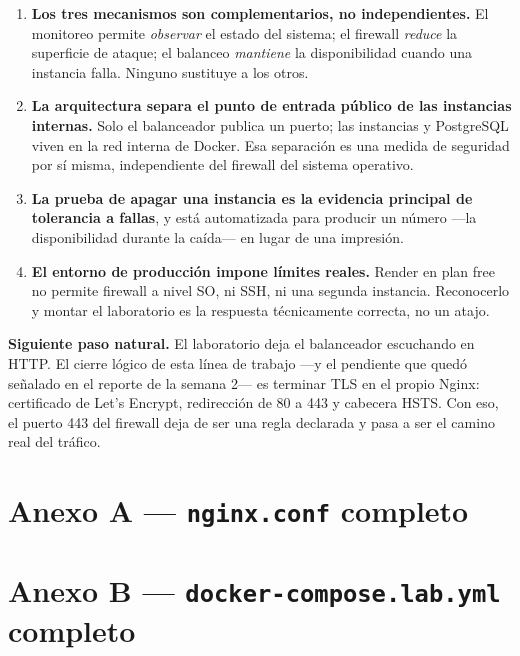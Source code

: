 \documentclass[11pt,letterpaper]{article}
\begin{document}
\begin{enumerate}[leftmargin=1.4em,itemsep=4pt]
  \item \textbf{Los tres mecanismos son complementarios, no independientes.} El
        monitoreo permite \emph{observar} el estado del sistema; el firewall
        \emph{reduce} la superficie de ataque; el balanceo \emph{mantiene} la
        disponibilidad cuando una instancia falla. Ninguno sustituye a los otros.
  \item \textbf{La arquitectura separa el punto de entrada público de las
        instancias internas.} Solo el balanceador publica un puerto; las
        instancias y PostgreSQL viven en la red interna de Docker. Esa
        separación es una medida de seguridad por sí misma, independiente del
        firewall del sistema operativo.
  \item \textbf{La prueba de apagar una instancia es la evidencia principal de
        tolerancia a fallas}, y está automatizada para producir un número —la
        disponibilidad durante la caída— en lugar de una impresión.
  \item \textbf{El entorno de producción impone límites reales.} Render en plan
        free no permite firewall a nivel SO, ni SSH, ni una segunda instancia.
        Reconocerlo y montar el laboratorio es la respuesta técnicamente
        correcta, no un atajo.
\end{enumerate}

\vspace{0.8em}
\begin{nota}
\textbf{Siguiente paso natural.} El laboratorio deja el balanceador escuchando en
HTTP. El cierre lógico de esta línea de trabajo —y el pendiente que quedó
señalado en el reporte de la semana 2— es terminar TLS en el propio Nginx:
certificado de Let's Encrypt, redirección de 80 a 443 y cabecera HSTS. Con eso,
el puerto 443 del firewall deja de ser una regla declarada y pasa a ser el
camino real del tráfico.
\end{nota}

\newpage
\section*{Anexo A — \texttt{nginx.conf} completo}



\newpage
\section*{Anexo B — \texttt{docker-compose.lab.yml} completo}
\end{document}
